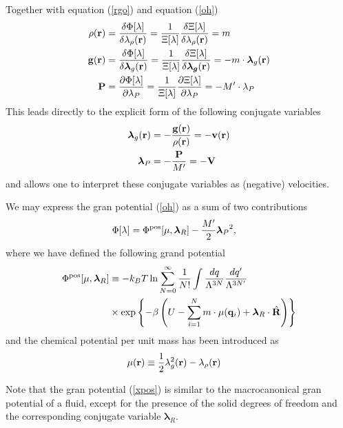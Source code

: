 \documentclass[b5paper,openright,10pt]{book}
\begin{document}
Together with equation (\ref{rgo}) and equation (\ref{oh})
\begin{align}
  \rho({\bf r}) &=\frac{\delta \Phi [\lambda]}{\delta \lambda_\rho({\bf r}) } = \frac{1}{\Xi[\lambda]} \frac{\delta\Xi [\lambda]}{\delta \lambda_{\rho}({\bf r})} = m
  \nonumber\\
  {\bf g}({\bf r}) &=\frac{\delta \Phi [\lambda]}{\delta \boldsymbol{\lambda}_g({\bf r}) } =\frac{1}{\Xi[\lambda]} \frac{\delta\Xi [\lambda]}{\delta \boldsymbol{\lambda_g}({\bf r})} = -m\cdot\boldsymbol{\lambda}_g({\bf r})
 \nonumber\\
 {\bf P} &=\frac{\partial \Phi [\lambda]}{\partial \lambda_P} =\frac{1}{\Xi[\lambda]} \frac{\partial\Xi [\lambda]}{\partial \lambda_P} = -M'\cdot\lambda_P
\end{align}
This leads directly to the explicit form of the following conjugate variables
\begin{align}
 \boldsymbol{\lambda}_g({\bf r}) &= -\frac{{\bf g}({\bf r})}{\rho({\bf r})}=-{\bf v}({\bf r})
\nonumber\\
\boldsymbol{\lambda}_P &= -\frac{{\bf P}}{M'} = -{\bf V}
\label{nu}
\end{align}
and allows  one to interpret  these conjugate variables  as (negative)
velocities.  


We may express the gran potential (\ref{oh}) as a sum of two contributions
\begin{align}
\Phi [\lambda]&=  \Phi^{\rm pos}[\mu,\boldsymbol{\lambda}_R]
-\frac{M'}{2} {\boldsymbol{\lambda}_P}^2,
\label{xpos1}
\end{align}
where we have defined the following grand potential
\begin{align}
\Phi^{\rm pos}[\mu,\boldsymbol{\lambda}_R]
&\equiv-k_BT\ln
 \sum_{N=0}^\infty \frac{1}{N!}
\int \frac{dq}{\Lambda^{3N}}\frac{dq'}{\Lambda^{3N'}}\nonumber\\
&\times
\exp\left\{-\beta  \left(U-\sum_{i=1}^N m\cdot\mu({\bf
    q}_i)+ \boldsymbol{\lambda}_R\cdot\hat{\bf R}\right)\right\}
\label{xpos}
\end{align}
and the chemical potential per unit mass has been introduced as
\begin{align}
  \mu({\bf r})&\equiv\frac{1}{2}\lambda_g^2({\bf r})-\lambda_\rho({\bf r})
\label{chempot}
\end{align}

Note that the gran potential (\ref{xpos}) is similar to the macrocanonical gran potential of a fluid, except for the presence of the solid degrees of freedom and the corresponding conjugate variable $\boldsymbol{\lambda}_R$. 
\end{document}
